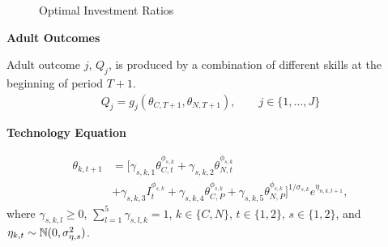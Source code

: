 \begin{frame}\begin{figure}\caption{Optimal Investment Ratios}
\end{figure}\end{frame}
\begin{frame}\textbf{Adult Outcomes}\vspace{0.3cm}

Adult outcome $j$, $Q_j$, is produced by a combination of different skills at the beginning of period $T + 1$.
\begin{align*}
Q_j = g_j(\theta_{C, T + 1}, \theta_{N, T + 1}), \qquad j \in\{1, \hdots, J\}
\end{align*}

\end{frame}
\begin{frame}\textbf{Technology Equation}\vspace{0.3cm}

\begin{align*}
\theta_{k, t + 1} & = [\gamma_{s, k, 1} \theta^{\phi_{s, k}}_{C, t}  + \gamma_{s, k, 2} \theta^{\phi_{s, k}}_{N, t}  \\
                  &  + \gamma_{s, k, 3} I^{\phi_{s, k}}_{t} +  \gamma_{s, k, 4} \theta^{\phi_{s, k}}_{C, P} + \gamma_{s, k, 5} \theta^{\phi_{s, k}}_{N, P}]^{1/\sigma_{s, k}}e^{\eta_{n, k, t +1}},
\end{align*}
where $\gamma_{s, k, l}\geq 0$, $\sum^5_{l = 1} \gamma_{s, l, k} = 1$, $k\in\{C, N\}$, $t\in\{1, 2\}$, $s\in\{1, 2\}$, and $\eta_{k,t}\sim\mathbb{N}(0, \sigma^2_{\eta, s})$.
\end{frame}
